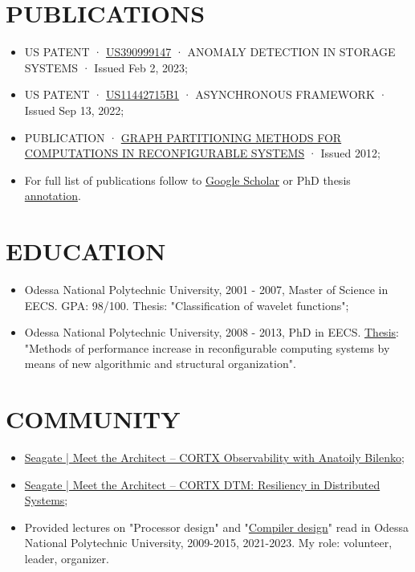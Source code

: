 \documentclass[8pt,a4paper]{article}
\begin{document}
\section*{PUBLICATIONS}
\label{sec:orgc6c3e70}
\begin{itemize}
\item US PATENT · \href{https://patents.google.com/patent/US20230035666A1}{US390999147} · ANOMALY DETECTION IN STORAGE SYSTEMS · Issued Feb 2, 2023;
\item US PATENT · \href{https://patents.google.com/patent/US11442715B1/en?inventor=Anatolii+Bilenko}{US11442715B1} · ASYNCHRONOUS FRAMEWORK · Issued Sep 13, 2022;
\item PUBLICATION · \href{https://scholar.google.com/citations?view\_op=view\_citation\&hl=th\&user=j5r-Y28AAAAJ\&citation\_for\_view=j5r-Y28AAAAJ:Y0pCki6q\_DkC}{GRAPH PARTITIONING METHODS FOR COMPUTATIONS IN RECONFIGURABLE SYSTEMS} · Issued 2012;
\item For full list of publications follow to \href{https://scholar.google.com/citations?user=j5r-Y28AAAAJ\&hl=th}{Google Scholar} or PhD thesis \href{https://github.com/just-now/cv/blob/main/aref.pdf}{annotation}.
\end{itemize}

\section*{EDUCATION}
\label{sec:orgc2176b5}
\begin{itemize}
\item Odessa National Polytechnic University, 2001 - 2007, Master of
Science in EECS. GPA: 98/100. Thesis: "Classification of wavelet
functions";
\item Odessa National Polytechnic University, 2008 - 2013,
PhD in EECS. \href{https://github.com/just-now/cv/blob/main/aref.pdf}{Thesis}: "Methods of performance increase in reconfigurable
computing systems by means of new algorithmic and structural
organization".
\end{itemize}
\section*{COMMUNITY}
\label{sec:org6b9de50}
\begin{itemize}
\item \href{https://www.youtube.com/watch?v=FFTi2XNFb7A}{Seagate | Meet the Architect – CORTX Observability with Anatoily Bilenko};
\item \href{https://www.youtube.com/watch?v=ujyIsCt6bbM}{Seagate | Meet the Architect – CORTX DTM: Resiliency in Distributed Systems};
\item Provided lectures on "Processor design" and "\href{https://github.com/just-now/slisp/}{Compiler design}" read
in Odessa National Polytechnic University, 2009-2015, 2021-2023.
My role: volunteer, leader, organizer.
\end{itemize}
\end{document}
